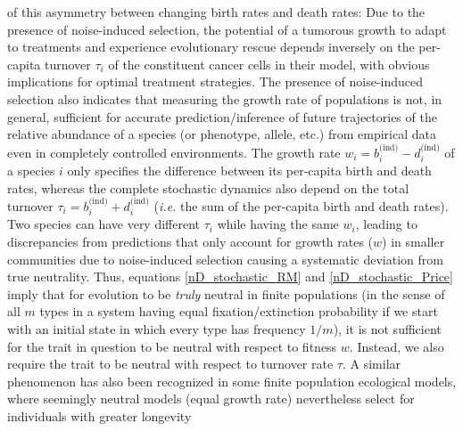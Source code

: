 of this asymmetry between changing birth rates and death rates: Due to the presence of noise-induced selection, the potential of a tumorous growth to adapt to treatments and experience evolutionary rescue depends inversely on the per-capita turnover $\tau_i$ of the constituent cancer cells in their model, with obvious implications for optimal treatment strategies. The presence of noise-induced selection also indicates that measuring the growth rate of populations is not, in general, sufficient for accurate prediction/inference of future trajectories of the relative abundance of a species (or phenotype, allele, etc.) from empirical data even in completely controlled environments. The growth rate $w_i = b^{\textrm{(ind)}}_{i} - d^{\textrm{(ind)}}_{i}$ of a species $i$ only specifies the difference between its per-capita birth and death rates, whereas the complete stochastic dynamics also depend on the total turnover $\tau_i = b^{\textrm{(ind)}}_{i} + d^{\textrm{(ind)}}_{i}$ (\emph{i.e.} the sum of the per-capita birth and death rates). Two species can have very different $\tau_i$ while having the same $w_i$, leading to discrepancies from predictions that only account for growth rates ($w$) in smaller communities due to noise-induced selection causing a systematic deviation from true neutrality. Thus, equations \eqref{nD_stochastic_RM} and \eqref{nD_stochastic_Price} imply that for evolution to be \emph{truly} neutral in finite populations (in the sense of all $m$ types in a system having equal fixation/extinction probability if we start with an initial state in which every type has frequency $1/m$), it is not sufficient for the trait in question to be neutral with respect to fitness $w$. Instead, we also require the trait to be neutral with respect to turnover rate $\tau$. A similar phenomenon has also been recognized in some finite population ecological models, where seemingly neutral models (equal growth rate) nevertheless select for individuals with greater longevity \citep{lin_features_2012, oliveira_advantage_2017}\\

